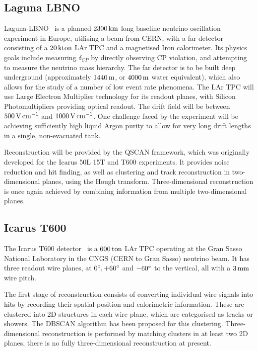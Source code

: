 \subsection{Laguna LBNO}
Laguna-LBNO~\citep{Laguna} is a planned $2300\km$ long baseline neutrino oscillation experiment in Europe, utilising a beam from CERN, with a far detector consisting of a $20\kton$ \acs{LAr TPC} and a magnetised Iron calorimeter. Its physics goals include measuring $\delta_{CP}$ by directly observing CP violation, and attempting to measure the neutrino mass hierarchy. The far detector is to be built deep underground (approximately $1440\metre$, or $4000\metre$ water equivalent), which also allows for the study of a number of low event rate phenomena. The \acs{LAr TPC} will use Large Electron Multiplier technology for its readout planes, with Silicon Photomultipliers providing optical readout. The drift field will be between $500\volt\cm^{-1}$ and $1000\volt\cm^{-1}$. One challenge faced by the experiment will be achieving sufficiently high liquid Argon purity to allow for very long drift lengths in a single, non-evacuated tank.

Reconstruction will be provided by the QSCAN framework, which was originally developed for the Icarus 50L 15T and T600 experiments. It provides noise reduction and hit finding, as well as clustering and track reconstruction in two-dimensional planes, using the Hough transform. Three-dimensional reconstruction is once again achieved by combining information from multiple two-dimensional planes.

\subsection{Icarus T600}
The Icarus T600 detector~\citep{Icarus2013} is a $600\ton$ \acs{LAr TPC} operating at the Gran Sasso National Laboratory in the CNGS (CERN to Gran Sasso) neutrino beam. It has three readout wire planes, at $0\degree, +60\degree$ and $-60\degree$ to the vertical, all with a $3\mm$ wire pitch.

The first stage of reconstruction consists of converting individual wire signals into hits by recording their spatial position and calorimetric information. These are clustered into 2D structures in each wire plane, which are categorised as tracks or showers. The DBSCAN algorithm has been proposed for this clustering. Three-dimensional reconstruction is performed by matching clusters in at least two 2D planes, there is no fully three-dimensional reconstruction at present.

